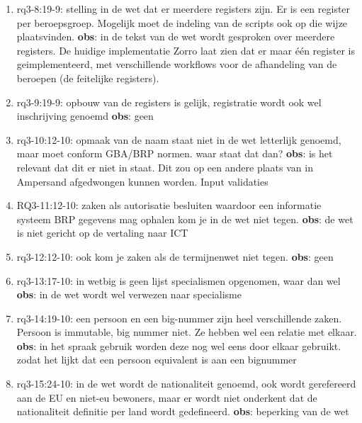 \begin{enumerate}
    \item rq3-8:19-9: stelling in de wet dat er meerdere registers zijn. 
    Er is een register per beroepsgroep. 
    Mogelijk moet de indeling van de scripts ook op die wijze plaatsvinden.
    \newline\textbf{obs}: in de tekst van de wet wordt gesproken over meerdere registers. 
    De huidige implementatie Zorro laat zien dat er maar één register is geimplementeerd, met verschillende workflows voor de afhandeling van de beroepen (de feitelijke registers).
    
    \item rq3-9:19-9: opbouw van de registers is gelijk, registratie wordt ook wel inschrijving genoemd
    \newline\textbf{obs}: geen
    
    \item rq3-10:12-10: opmaak van de naam staat niet in de wet letterlijk genoemd, maar moet conform GBA/BRP normen. waar staat dat dan?
     \newline\textbf{obs}: is het relevant dat dit er niet in staat. 
     Dit zou op een andere plaats van in Ampersand afgedwongen kunnen worden. 
     Input validaties
     
    \item RQ3-11:12-10: zaken als autorisatie besluiten waardoor een informatie systeem BRP gegevens mag ophalen kom je in de wet niet tegen.
     \newline\textbf{obs}: de wet is niet gericht op de vertaling naar ICT
     
    \item rq3-12:12-10: ook kom je zaken als de termijnenwet niet tegen.
     \newline\textbf{obs}: geen
     
    \item rq3-13:17-10: in wetbig is geen lijst specialismen opgenomen, waar dan wel
     \newline\textbf{obs}: in de wet wordt wel verwezen naar specialisme
     
    \item rq3-14:19-10: een persoon en een big-nummer zijn heel verschillende zaken. Persoon is immutable, big nummer niet. Ze hebben wel een relatie met elkaar.
     \newline\textbf{obs}: in het spraak gebruik worden deze nog wel eens door elkaar gebruikt. 
     zodat het lijkt dat een persoon equivalent is aan een bignummer
     
    \item rq3-15:24-10: in de wet wordt de nationaliteit genoemd, ook wordt gerefereerd aan de EU en niet-eu bewoners, maar er wordt niet onderkent dat de nationaliteit definitie per land wordt gedefineerd.
     \newline\textbf{obs}: beperking van de wet
     

\end{enumerate}
